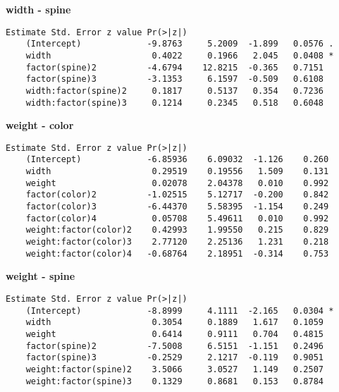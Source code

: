 \documentclass[a4paper, twocolumn]{article}
\begin{document}
\textbf{width - spine}
\begin{Verbatim}[fontsize=\scriptsize]
                            Estimate Std. Error z value Pr(>|z|)
    (Intercept)             -9.8763     5.2009  -1.899   0.0576 .
    width                    0.4022     0.1966   2.045   0.0408 *
    factor(spine)2          -4.6794    12.8215  -0.365   0.7151  
    factor(spine)3          -3.1353     6.1597  -0.509   0.6108  
    width:factor(spine)2     0.1817     0.5137   0.354   0.7236  
    width:factor(spine)3     0.1214     0.2345   0.518   0.6048    
\end{Verbatim}

\textbf{weight - color}
\begin{Verbatim}[fontsize=\scriptsize]
                            Estimate Std. Error z value Pr(>|z|)
    (Intercept)             -6.85936    6.09032  -1.126    0.260
    width                    0.29519    0.19556   1.509    0.131
    weight                   0.02078    2.04378   0.010    0.992
    factor(color)2          -1.02515    5.12717  -0.200    0.842
    factor(color)3          -6.44370    5.58395  -1.154    0.249
    factor(color)4           0.05708    5.49611   0.010    0.992
    weight:factor(color)2    0.42993    1.99550   0.215    0.829
    weight:factor(color)3    2.77120    2.25136   1.231    0.218
    weight:factor(color)4   -0.68764    2.18951  -0.314    0.753    
\end{Verbatim}

\textbf{weight - spine}
\begin{Verbatim}[fontsize=\scriptsize]
                            Estimate Std. Error z value Pr(>|z|)
    (Intercept)             -8.8999     4.1111  -2.165   0.0304 *
    width                    0.3054     0.1889   1.617   0.1059  
    weight                   0.6414     0.9111   0.704   0.4815  
    factor(spine)2          -7.5008     6.5151  -1.151   0.2496  
    factor(spine)3          -0.2529     2.1217  -0.119   0.9051  
    weight:factor(spine)2    3.5066     3.0527   1.149   0.2507  
    weight:factor(spine)3    0.1329     0.8681   0.153   0.8784 
\end{Verbatim}
\end{document}
